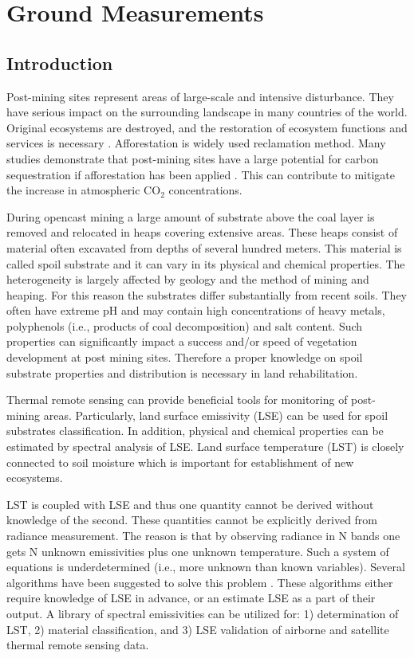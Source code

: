 \chapter{Ground Measurements}

\section{Introduction}

Post-mining sites represent areas of large-scale and intensive disturbance. They have serious impact on the surrounding landscape in many countries of the world. Original ecosystems are destroyed, and the restoration of ecosystem functions and services is necessary \cite{BH01}. Afforestation is widely used reclamation method. Many studies demonstrate that post-mining sites have a large potential for carbon sequestration if afforestation has been applied \cite{VF13, FL13, SL05, UL06}. This can contribute to mitigate the increase in atmospheric $\mathrm{CO_2}$ concentrations.

During opencast mining a large amount of substrate above the coal layer is removed and relocated in heaps covering extensive areas. These heaps consist of material often excavated from depths of several hundred meters. This material is called spoil substrate and it can vary in its physical and chemical properties. The heterogeneity is largely affected by geology and the method of mining and heaping. For this reason the substrates differ substantially from recent soils. They often have extreme pH and may contain high concentrations of heavy metals, polyphenols (i.e., products of coal decomposition) and salt content. Such properties can significantly impact a success and/or speed of vegetation development at post mining sites. Therefore a proper knowledge on spoil substrate properties and distribution is necessary in land rehabilitation. 

Thermal remote sensing can provide beneficial tools for monitoring of post-mining areas. Particularly, land surface emissivity (LSE) can be used for spoil substrates classification. In addition, physical and chemical properties can be estimated by spectral analysis of LSE. Land surface temperature (LST) is closely connected to soil moisture which is important for establishment of new ecosystems.

LST is coupled with LSE and thus one quantity cannot be derived without knowledge of the second. These quantities cannot be explicitly derived from radiance measurement. The reason is that by observing radiance in N bands one gets N unknown emissivities plus one unknown temperature. Such a system of equations is underdetermined (i.e., more unknown than known variables). Several algorithms have been suggested to solve this problem \cite{LT13}. These algorithms either require knowledge of LSE in advance, or an estimate LSE as a part of their output. A library of spectral emissivities can be utilized for: 1) determination of LST, 2) material classification, and 3) LSE validation of airborne and satellite thermal remote sensing data.

